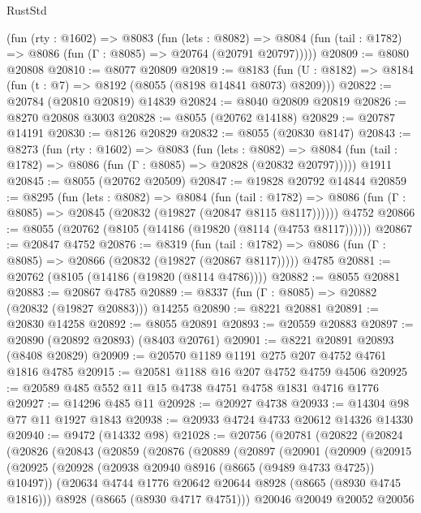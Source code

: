 \begin{lexlean}{RustStd}
\begin{coremodule}
    (fun (rty : @1602) =>
    @8083
      (fun (lets : @8082) =>
      @8084 (fun (tail : @1782) => @8086 (fun (Γ : @8085) => @20764 (@20791 @20797)))))
@20809 := @8080 @20808
@20810 := @8077 @20809
@20819 := @8183
    (fun (U : @8182) => @8184 (fun (t : @7) => @8192 (@8055 (@8198 @14841 @8073) @8209)))
@20822 := @20784 (@20810 @20819) @14839
@20824 := @8040 @20809 @20819
@20826 := @8270 @20808 @3003
@20828 := @8055 (@20762 @14188)
@20829 := @20787 @14191
@20830 := @8126 @20829
@20832 := @8055 (@20830 @8147)
@20843 := @8273
    (fun (rty : @1602) =>
    @8083
      (fun (lets : @8082) =>
      @8084 (fun (tail : @1782) => @8086 (fun (Γ : @8085) => @20828 (@20832 @20797)))))
    @1911
@20845 := @8055 (@20762 @20509)
@20847 := @19828 @20792 @14844
@20859 := @8295
    (fun (lets : @8082) =>
    @8084
      (fun (tail : @1782) =>
      @8086 (fun (Γ : @8085) => @20845 (@20832 (@19827 (@20847 @8115 @8117))))))
    @4752
@20866 := @8055 (@20762 (@8105 (@14186 (@19820 (@8114 (@4753 @8117))))))
@20867 := @20847 @4752
@20876 := @8319
    (fun (tail : @1782) => @8086 (fun (Γ : @8085) => @20866 (@20832 (@19827 (@20867 @8117)))))
    @4785
@20881 := @20762 (@8105 (@14186 (@19820 (@8114 @4786))))
@20882 := @8055 @20881
@20883 := @20867 @4785
@20889 := @8337 (fun (Γ : @8085) => @20882 (@20832 (@19827 @20883))) @14255
@20890 := @8221 @20881
@20891 := @20830 @14258
@20892 := @8055 @20891
@20893 := @20559 @20883
@20897 := @20890 (@20892 @20893) (@8403 @20761)
@20901 := @8221 @20891 @20893 (@8408 @20829)
@20909 := @20570 @1189 @1191 @275 @207 @4752 @4761 @1816 @4785
@20915 := @20581 @1188 @16 @207 @4752 @4759 @4506
@20925 := @20589 @485 @552 @11 @15 @4738 @4751 @4758 @1831 @4716 @1776
@20927 := @14296 @485 @11
@20928 := @20927 @4738
@20933 := @14304 @98 @77 @11 @1927 @1843
@20938 := @20933 @4724 @4733 @20612 @14326 @14330
@20940 := @9472 (@14332 @98)
@21028 := @20756
    (@20781
      (@20822
        (@20824
          (@20826
            (@20843
              (@20859
                (@20876
                  (@20889
                    (@20897
                      (@20901
                        (@20909
                          (@20915
                            (@20925
                              (@20928 (@20938 @20940 @8916 (@8665 (@9489 @4733 @4725)) @10497))
                              (@20634 @4744 @1776 @20642 @20644 @8928 (@8665 (@8930 @4745 @1816)))
                              @8928
                              (@8665 (@8930 @4717 @4751)))
                            @20046
                            @20049
                            @20052
                            @20056

\end{coremodule}
\end{lexlean}

